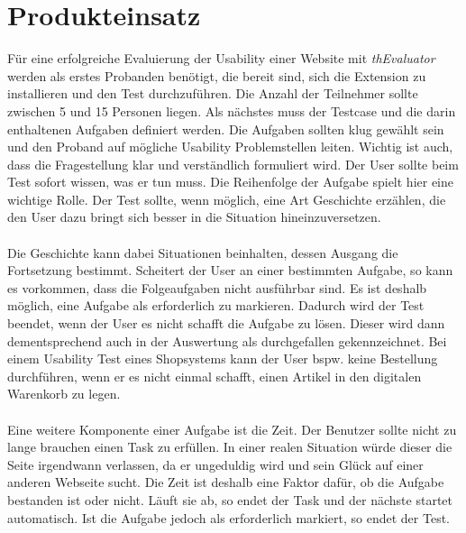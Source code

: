 %
%
%
%

\section{Produkteinsatz}

Für eine erfolgreiche Evaluierung der Usability einer Website mit \textit{thEvaluator} werden als erstes Probanden benötigt, die bereit sind, sich die Extension zu installieren und den Test durchzuführen. Die Anzahl der Teilnehmer sollte zwischen 5 und 15 Personen liegen. Als nächstes muss der Testcase und die darin enthaltenen Aufgaben definiert werden. Die Aufgaben sollten klug gewählt sein und den Proband auf mögliche Usability Problemstellen leiten. Wichtig ist auch, dass die Fragestellung klar und verständlich formuliert wird. Der User sollte beim Test sofort wissen, was er tun muss. Die Reihenfolge der Aufgabe spielt hier eine wichtige Rolle. Der Test sollte, wenn möglich, eine Art Geschichte erzählen, die den User dazu bringt sich besser in die Situation hineinzuversetzen.\\
\\
Die Geschichte kann dabei Situationen beinhalten, dessen Ausgang die Fortsetzung bestimmt. Scheitert der User an einer bestimmten Aufgabe, so kann es vorkommen, dass die Folgeaufgaben nicht ausführbar sind. Es ist deshalb möglich, eine Aufgabe als \glqq erforderlich\grqq{} zu markieren. Dadurch wird der Test beendet, wenn der User es nicht schafft die Aufgabe zu lösen. Dieser wird dann dementsprechend auch in der Auswertung als \glqq durchgefallen\grqq{} gekennzeichnet. Bei einem Usability Test eines Shopsystems kann der User bspw. keine Bestellung durchführen, wenn er es nicht einmal schafft, einen Artikel in den digitalen Warenkorb zu legen.\\
\\
Eine weitere Komponente einer Aufgabe ist die Zeit. Der Benutzer sollte nicht zu lange brauchen einen Task zu erfüllen. In einer realen Situation würde dieser die Seite irgendwann verlassen, da er ungeduldig wird und sein Glück auf einer anderen Webseite sucht. Die Zeit ist deshalb eine Faktor dafür, ob die Aufgabe bestanden ist oder nicht. Läuft sie ab, so endet der Task und der nächste startet automatisch. Ist die Aufgabe jedoch als \glqq erforderlich\grqq{} markiert, so endet der Test.\\
